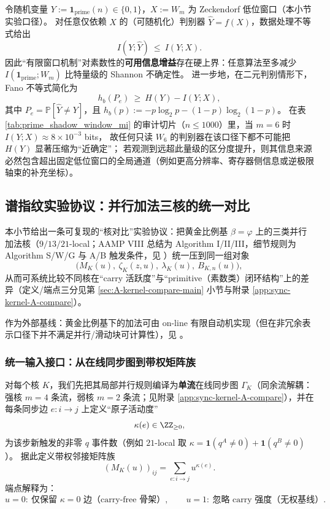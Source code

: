 

\begin{remark}\label{rem:prime-shadow-window-mi-algorithmic-lb}
令随机变量 \(Y:=\mathbf{1}_{\mathrm{prime}}(n)\in\{0,1\}\)，\(X:=W_m\) 为 Zeckendorf 低位窗口（本小节实验口径）。
对任意仅依赖 \(X\) 的（可随机化）判别器 \(\widehat Y=f(X)\)，数据处理不等式给出
\[
I(Y;\widehat Y)\ \le\ I(Y;X).
\]
因此“有限窗口机制”对素数性的\textbf{可用信息增益}存在硬上界：任意算法至多减少
\(
I(\mathbf{1}_{\mathrm{prime}};W_m)
\)
比特量级的 Shannon 不确定性。
进一步地，在二元判别情形下，Fano 不等式简化为
\[
h_b(P_e)\ \ge\ H(Y)-I(Y;X),
\]
其中 \(P_e=\mathbb{P}[\widehat Y\neq Y]\)，且 \(h_b(p):=-p\log_2 p-(1-p)\log_2(1-p)\)。
在表 \ref{tab:prime_shadow_window_mi} 的审计切片（\(n\le 1000\)）里，当 \(m=6\) 时 \(I(Y;X)\approx 8\times 10^{-3}\) bits，
故任何只读 \(W_6\) 的判别器在该口径下都不可能把 \(H(Y)\) 显著压缩为“近确定”；
若观测到远超此量级的区分度提升，则其信息来源必然包含超出固定低位窗口的全局通道（例如更高分辨率、寄存器侧信息或逆极限轴束的补充坐标）。
\end{remark}

\subsection{谱指纹实验协议：并行加法三核的统一对比}\label{sec:exp-kernel-fingerprint}
本小节给出一条可复现的“核对比”实验协议：把黄金比例基 $\beta=\varphi$ 上的三类并行加法核（$9/13/21$-local；AAMP VIII 总结为 Algorithm I/II/III，细节规则为 Algorithm S/W/G 与 A/B 触发条件，见 \cite{SvobodovaAAMPVIIIParallelAddition,FrougnyHellerPelantovaSvobodovaParallelAlgorithmsSlides}）统一压到同一组对象
\[
\bigl(M_K(u),\ \zeta_K(z,u),\ \lambda_K(u),\ B_{K,n}(u)\bigr),
\]
从而可系统比较不同核在“carry 活跃度”与“primitive（素数类）闭环结构”上的差异（定义/端点三分见第 \ref{sec:A-kernel-compare-main} 小节与附录 \ref{app:sync-kernel-A-compare}）。
\par
作为外部基线：黄金比例基下的加法可由 on-line 有限自动机实现（但在非冗余表示口径下并不满足并行/滑动块可计算性），见 \cite{Frougny1999OnlineAddition}。

\subsubsection{统一输入接口：从在线同步图到带权矩阵族}
对每个核 $K$，我们先把其局部并行规则编译为\textbf{单流}在线同步图 $\Gamma_K$（同余流解耦：强核 $m=4$ 条流，弱核 $m=2$ 条流；见附录 \ref{app:sync-kernel-A-compare}），并在每条同步边 $e:i\to j$ 上定义“原子活动度”
\[
\kappa(e)\in\ZZ_{\ge 0},
\]
为该步新触发的非零 $q$ 事件数（例如 $21$-local 取 $\kappa=\mathbf{1}(q^A\neq 0)+\mathbf{1}(q^B\neq 0)$）。
据此定义带权邻接矩阵族
\[
(M_K(u))_{ij}=\sum_{e:i\to j}u^{\kappa(e)}.
\]
端点解释为：
\[
u=0:\ \text{仅保留 $\kappa=0$ 边（carry-free 骨架）},\qquad
u=1:\ \text{忽略 carry 强度（无权基线）}.
\]

